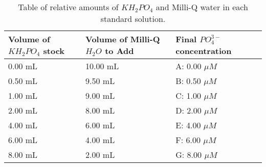 \documentclass[]{article}   %
\begin{document}
\begin{table}[h]
    \begin{tabular}{ | p{3cm} | p{3cm} | p{3cm} |}
    \hline
    Volume of $KH_2PO_4$ stock  & Volume of Milli-Q $H_2O$ to Add  & Final $PO_4^{3-}$ concentration \\ \hline
    0.00 mL & 10.00 mL & A: 0.00 $\mu M$ \\ \hline
    0.50 mL & 9.50 mL & B: 0.50 $\mu M$ \\ \hline
    1.00 mL & 9.00 mL & C: 1.00 $\mu M$ \\ \hline
    2.00 mL & 8.00 mL & D: 2.00 $\mu M$ \\ \hline
    4.00 mL & 6.00 mL & E: 4.00 $\mu M$ \\ \hline
    6.00 mL & 4.00 mL & F: 6.00 $\mu M$ \\ \hline
    8.00 mL & 2.00 mL & G: 8.00 $\mu M$ \\ \hline
    \end{tabular}
    \caption{Table of relative amounts of $KH_2PO_4$ and Milli-Q water in each standard solution.}
    \label{table:stds}
\end{table}





\begin{thebibliography}{9}
\end{thebibliography}
\end{document}
